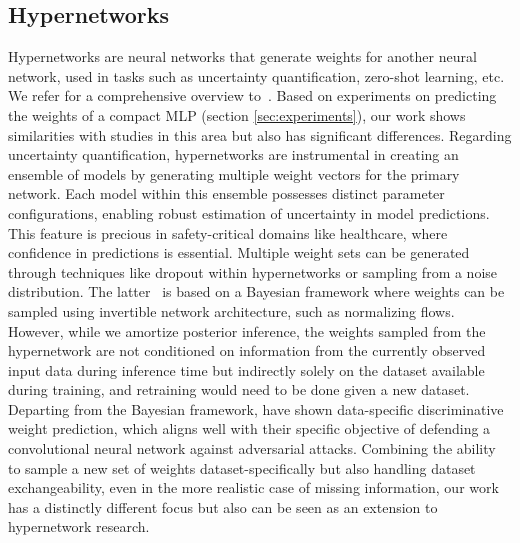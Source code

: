 \subsection{Hypernetworks}
Hypernetworks are neural networks that generate weights for another neural network, used in tasks such as uncertainty quantification, zero-shot learning, etc. We refer for a comprehensive overview to~\cite{chauhan2023hyperreview}. Based on experiments on predicting the weights of a compact MLP (section \ref{sec:experiments}), our work shows similarities with studies in this area but also has significant differences. 
Regarding uncertainty quantification, hypernetworks are instrumental in creating an ensemble of models by generating multiple weight vectors for the primary network. Each model within this ensemble possesses distinct parameter configurations, enabling robust estimation of uncertainty in model predictions. This feature is precious in safety-critical domains like healthcare, where confidence in predictions is essential. Multiple weight sets can be generated through techniques like dropout within hypernetworks or sampling from a noise distribution.
The latter~\citep{krueger2017hyperbayesian} is based on a Bayesian framework where weights can be sampled using invertible network architecture, such as normalizing flows. However, while we amortize posterior inference, the weights sampled from the hypernetwork are not conditioned on information from the currently observed input data during inference time but indirectly solely on the dataset available during training, and retraining would need to be done given a new dataset. 
Departing from the Bayesian framework, \cite{sun2017hypercnn} have shown data-specific discriminative weight prediction, which aligns well with their specific objective of defending a convolutional neural network against adversarial attacks.
Combining the ability to sample a new set of weights dataset-specifically but also handling dataset exchangeability, even in the more realistic case of missing information, our work has a distinctly different focus but also can be seen as an extension to hypernetwork research. 

